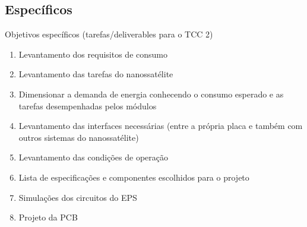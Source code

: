 \subsection{Específicos}\label{especificos}
Objetivos específicos (tarefas/deliverables para o TCC 2)
\begin{enumerate}
    \item Levantamento dos requisitos de consumo
    \item Levantamento das tarefas do nanossatélite
    \item Dimensionar a demanda de energia conhecendo o consumo esperado e as tarefas desempenhadas pelos módulos
    \item Levantamento das interfaces necessárias (entre a própria placa e também com outros sistemas do nanossatélite)
    \item Levantamento das condições de operação
    \item Lista de especificações e componentes escolhidos para o projeto
    \item Simulações dos circuitos do EPS
    \item Projeto da PCB
\end{enumerate}

